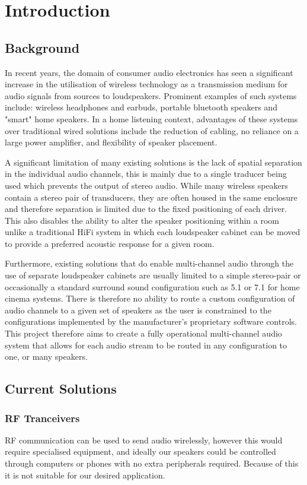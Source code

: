 \documentclass[main.tex]{subfiles}
\begin{document}
\chapter{Introduction}
\section{Background}
In recent years, the domain of consumer audio electronics has seen a significant increase in the utilisation of wireless technology as a transmission medium for audio signals from sources to loudspeakers.
Prominent examples of such systems include: wireless headphones and earbuds, portable bluetooth speakers and "smart" home speakers. 
In a home listening context, advantages of these systems over traditional wired solutions include the reduction of cabling, no reliance on a large power amplifier, and flexibility of speaker placement.

\medskip
A significant limitation of many existing solutions is the lack of spatial separation in the individual audio channels, this is mainly due to a single traducer being used which prevents the output of stereo audio.
While many wireless speakers contain a stereo pair of transducers, they are often housed in the same enclosure and therefore separation is limited due to the fixed positioning of each driver.
This also disables the ability to alter the speaker positioning within a room unlike a traditional HiFi system in which each loudspeaker cabinet can be moved to provide a preferred acoustic response for a given room. 

\medskip
Furthermore, existing solutions that do enable multi-channel audio through the use of separate loudspeaker cabinets are usually limited to a simple stereo-pair or occasionally a standard surround sound configuration such as 5.1 or 7.1 for home cinema systems.
There is therefore no ability to route a custom configuration of audio channels to a given set of speakers as the user is constrained to the configurations implemented by the manufacturer's proprietary software controls. 
This project therefore aims to create a fully operational multi-channel audio system that allows for each audio stream to be routed in any configuration to one, or many speakers.


\section{Current Solutions}
\subsection{RF Tranceivers}
RF communication can be used to send audio wirelessly, however this would require specialised equipment, and ideally our speakers could be controlled through computers or phones with no extra peripherals required.
Because of this it is not suitable for our desired application.
\end{document}
